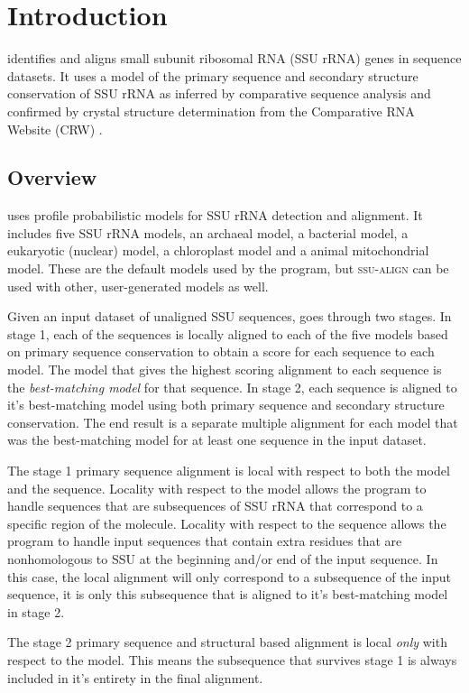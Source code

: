 \section{Introduction}

 identifies and aligns small subunit ribosomal RNA
(SSU rRNA) genes in sequence datasets. It uses a model of the primary
sequence and secondary structure conservation of SSU rRNA as inferred
by comparative sequence analysis and confirmed by crystal structure
determination from the Comparative RNA Website (CRW) \cite{Cannone02}.

\subsection{Overview}
 uses profile probabilistic models for SSU rRNA
detection and alignment. It includes five SSU rRNA models, an archaeal
model, a bacterial model, a eukaryotic (nuclear) model, a
chloroplast model and a animal mitochondrial model. These are the
default models used by the program, but \textsc{ssu-align} can be used
with other, user-generated models as well.

Given an input dataset of unaligned SSU sequences,
 goes through two stages. In stage 1, each of the
sequences is locally aligned to each of the five models based on
primary sequence conservation to obtain a score for each sequence to
each model.  The model that gives the highest scoring alignment to
each sequence is the \emph{best-matching model} for that sequence.  In
stage 2, each sequence is aligned to it's best-matching model using
both primary sequence and secondary structure conservation. The end
result is a separate multiple alignment for each model that was the
best-matching model for at least one sequence in the input dataset.

The stage 1 primary sequence alignment is local with respect to both
the model and the sequence. Locality with respect to the model allows
the program to handle sequences that are subsequences of SSU
rRNA that correspond to a specific region of the molecule. Locality
with respect to the sequence allows the program to handle input
sequences that contain extra residues that are nonhomologous to SSU at
the beginning and/or end of the input sequence. In this case, the
local alignment will only correspond to a subsequence of the input
sequence, it is only this subsequence that is aligned to it's
best-matching model in stage 2.

The stage 2 primary sequence and structural based alignment is local
\emph{only} with respect to the model.  This means the subsequence
that survives stage 1 is always included in it's entirety in the final
alignment.

